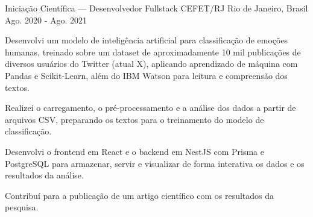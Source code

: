 \begin{cventries}
  \cventry
    {Iniciação Científica --- Desenvolvedor Fullstack} %
    {CEFET/RJ} %
    {Rio de Janeiro, Brasil} %
    {Ago. 2020 - Ago. 2021} %
    {
      \begin{cvitems} %
        \item {Desenvolvi um modelo de inteligência artificial para classificação de emoções humanas, treinado sobre um dataset de aproximadamente 10 mil publicações de diversos usuários do Twitter (atual X), aplicando aprendizado de máquina com Pandas e Scikit-Learn, além do IBM Watson para leitura e compreensão dos textos.}
        \item {Realizei o carregamento, o pré-processamento e a análise dos dados a partir de arquivos CSV, preparando os textos para o treinamento do modelo de classificação.}
        \item {Desenvolvi o frontend em React e o backend em NestJS com Prisma e PostgreSQL para armazenar, servir e visualizar de forma interativa os dados e os resultados da análise.}
        \item {Contribuí para a publicação de um artigo científico com os resultados da pesquisa.}
      \end{cvitems}
    }

\end{cventries}
